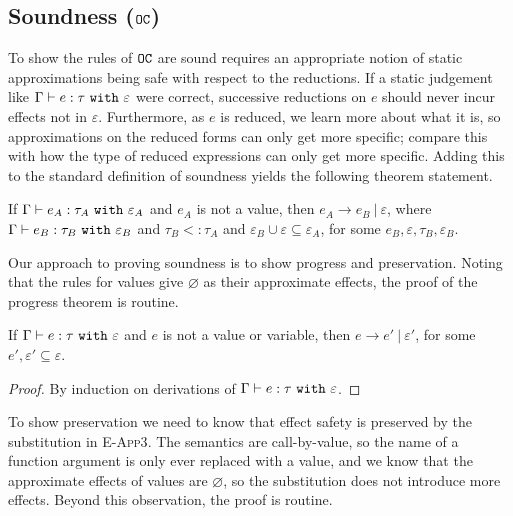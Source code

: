\subsection{Soundness ($\mathtt{OC}$)}

To show the rules of $\mathtt{OC}$ are sound requires an appropriate notion of static approximations being safe with respect to the reductions. If a static judgement like $\Gamma \vdash e: \tau~\mathtt{with}~ \varepsilon$ were correct, successive reductions on $e$ should never incur effects not in $\varepsilon$. Furthermore, as $e$ is reduced, we learn more about what it is, so approximations on the reduced forms can only get more specific; compare this with how the type of reduced expressions can only get more specific. Adding this to the standard definition of soundness yields the following theorem statement.

\begin{theorem}
If $ \Gamma \vdash  e_A:  \tau_A~\mathtt{with}~ \varepsilon_A$ and $ e_A$ is not a value, then $e_A \longrightarrow e_B~|~\varepsilon$, where $ \Gamma \vdash e_B:  \tau_B~\mathtt{with}~ \varepsilon_B$ and $ \tau_B <:  \tau_A$ and $\varepsilon_B \cup \varepsilon \subseteq \varepsilon_A$, for some $e_B, \varepsilon, \tau_B, \varepsilon_B$.
\end{theorem}

Our approach to proving soundness is to show progress and preservation. Noting that the rules for values give $\varnothing$ as their approximate effects, the proof of the progress theorem is routine.

\begin{theorem}
If $ \Gamma \vdash  e:  \tau~\mathtt{with}~ \varepsilon$ and $ e$ is not a value or variable, then $ e \longrightarrow  e'~|~\varepsilon'$, for some $e', \varepsilon' \subseteq \varepsilon$.
\end{theorem}

\begin{proof} By induction on derivations of $ \Gamma \vdash  e:  \tau~\mathtt{with}~ \varepsilon$.
\end{proof}

To show preservation we need to know that effect safety is preserved by the substitution in \textsc{E-App3}. The semantics are call-by-value, so the name of a function argument is only ever replaced with a value, and we know that the approximate effects of values are $\varnothing$, so the substitution does not introduce more effects. Beyond this observation, the proof is routine.

